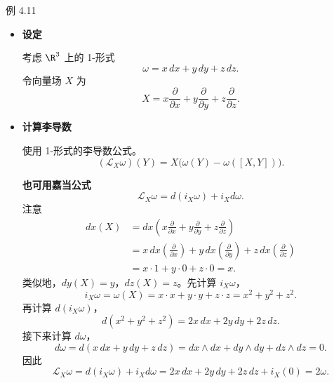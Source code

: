 \begin{statement}{例 4.11}{}
\begin{itemize}
  \item \textbf{设定}

  考虑 $\R^3$ 上的 1-形式
  \[
    \omega=x\,dx+y\,dy+z\,dz.
  \]
  令向量场 $X$ 为
  \[
    X=x\frac{\partial}{\partial x}+y\frac{\partial}{\partial y}
                                    +z\frac{\partial}{\partial z}.
  \]
  \item \textbf{计算李导数}

  使用 1-形式的李导数公式。
  \[
    (\mathcal L_X\omega)(Y)=X\bigl(\omega(Y)-\omega([X,Y])\bigr).
  \]

  \textbf{也可用嘉当公式}
  \[
    \mathcal L_X\omega=d(i_X\omega)+i_Xd\omega.
  \]
  注意
  \[
    \begin{aligned}
      dx(X)&=dx\!\left(x\frac{\partial}{\partial x}
                      +y\frac{\partial}{\partial y}+z\frac{\partial}{\partial z}\right)\\
      &=x\,dx\!\left(\frac{\partial}{\partial x}\right)
          +y\,dx\!\left(\frac{\partial}{\partial y}\right)
          +z\,dx\!\left(\frac{\partial}{\partial z}\right)\\
      &=x\cdot1+y\cdot0+z\cdot0=x.
    \end{aligned}
  \]
  类似地，$dy(X)=y$，$dz(X)=z$。先计算 $i_X\omega$，
  \[
    i_X\omega=\omega(X)=x\cdot x+y\cdot y+z\cdot z=x^2+y^2+z^2.
  \]
  再计算 $d(i_X\omega)$，
  \[
    d(x^2+y^2+z^2)=2x\,dx+2y\,dy+2z\,dz.
  \]
  接下来计算 $d\omega$，
  \[
    d\omega=d(x\,dx+y\,dy+z\,dz)=dx\wedge dx+dy\wedge dy+dz\wedge dz=0.
  \]
  因此
  \[
    \mathcal L_X\omega=d(i_X\omega)+i_Xd\omega
        =2x\,dx+2y\,dy+2z\,dz+i_X(0)=2\omega.
  \]
\end{itemize}
\end{statement}
